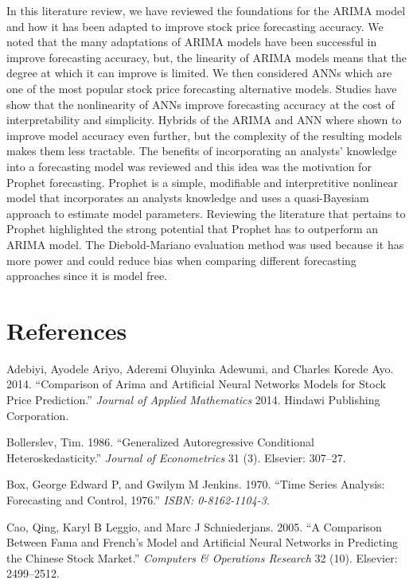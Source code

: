 \documentclass[12pt,preprint, authoryear]{elsarticle}
\numberwithin{equation}{section}
\numberwithin{figure}{section}
\numberwithin{table}{section}
\begin{document}
In this literature review, we have reviewed the foundations for the
ARIMA model and how it has been adapted to improve stock price
forecasting accuracy. We noted that the many adaptations of ARIMA models
have been successful in improve forecasting accuracy, but, the linearity
of ARIMA models means that the degree at which it can improve is
limited. We then considered ANNs which are one of the most popular stock
price forecasting alternative models. Studies have show that the
nonlinearity of ANNs improve forecasting accuracy at the cost of
interpretability and simplicity. Hybrids of the ARIMA and ANN where
shown to improve model accuracy even further, but the complexity of the
resulting models makes them less tractable. The benefits of
incorporating an analysts' knowledge into a forecasting model was
reviewed and this idea was the motivation for Prophet forecasting.
Prophet is a simple, modifiable and interpretitive nonlinear model that
incorporates an analysts knowledge and uses a quasi-Bayesiam approach to
estimate model parameters. Reviewing the literature that pertains to
Prophet highlighted the strong potential that Prophet has to outperform
an ARIMA model. The Diebold-Mariano evaluation method was used because
it has more power and could reduce bias when comparing different
forecasting approaches since it is model free.

\section*{References}\label{references}

\hypertarget{refs}{}
\hypertarget{ref-adebiyi2014comparison}{}
Adebiyi, Ayodele Ariyo, Aderemi Oluyinka Adewumi, and Charles Korede
Ayo. 2014. ``Comparison of Arima and Artificial Neural Networks Models
for Stock Price Prediction.'' \emph{Journal of Applied Mathematics}
2014. Hindawi Publishing Corporation.

\hypertarget{ref-bollerslev1986generalized}{}
Bollerslev, Tim. 1986. ``Generalized Autoregressive Conditional
Heteroskedasticity.'' \emph{Journal of Econometrics} 31 (3). Elsevier:
307--27.

\hypertarget{ref-box1970time}{}
Box, George Edward P, and Gwilym M Jenkins. 1970. ``Time Series
Analysis: Forecasting and Control, 1976.'' \emph{ISBN: 0-8162-1104-3}.

\hypertarget{ref-cao2005comparison}{}
Cao, Qing, Karyl B Leggio, and Marc J Schniederjans. 2005. ``A
Comparison Between Fama and French's Model and Artificial Neural
Networks in Predicting the Chinese Stock Market.'' \emph{Computers \&
Operations Research} 32 (10). Elsevier: 2499--2512.
\end{document}
